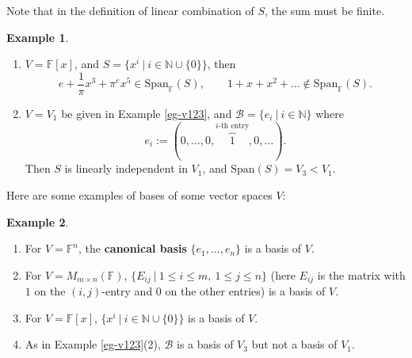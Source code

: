 \documentclass[11pt,openany]{book}
\theoremstyle{plain}
\theoremstyle{definition}
\newtheorem{example}[example]{Example}
\theoremstyle{remark}
\begin{document}
Note that in the definition of linear combination of $S$, the sum must be finite. 

\begin{example} \label{eg-finitesum}
\begin{enumerate}
    \item $V = \mathbb{F}[x]$, and $S = \{x^i \ |\ i \in \mathbb{N} \cup \{0\}\}$, then
$$e+ \frac{1}{\pi} x^3 + \pi^{e}x^5 \in \mathrm{Span}_{\mathbb{F}}(S), \quad \quad 1+x+x^2+ \dots \notin \mathrm{Span}_{\mathbb{F}}(S).$$
    \item $V = V_1$ be given in Example \ref{eg-v123}, and $\mathcal{B} = \{e_i\ |\ i \in \mathbb{N}\}$ where 
    $$e_i := (0,\dots,0,\overbrace{1}^{i\text{-th entry}},0,\dots).$$ 
    Then $S$ is linearly independent in $V_1$, and $\mathrm{Span}(S) = V_3 < V_1$.
\end{enumerate}    
\end{example}

Here are some examples of bases of some vector spaces $V$:
\begin{example}\
    \begin{enumerate}
        \item For $V = \mathbb{F}^n$, the {\bf canonical basis} $\{e_1, \dots, e_n\}$ is a basis of $V$.
        \item For $V = M_{m\times n}(\mathbb{F})$, $\{E_{ij}\ |\ 1 \leq i \leq m,\ 1 \leq j \leq n\}$ (here $E_{ij}$ is the matrix with $1$ on the $(i,j)$-entry and $0$ on the other entries) is a basis of $V$.
        \item For $V = \mathbb{F}[x]$, $\{x^i \ |\ i \in \mathbb{N} \cup \{0\}\}$ is a basis of $V$.
        \item As in Example \ref{eg-v123}(2), $\mathcal{B}$ is a basis of $V_3$ but not a basis of $V_1$.
    \end{enumerate}
\end{example}
\end{document}
